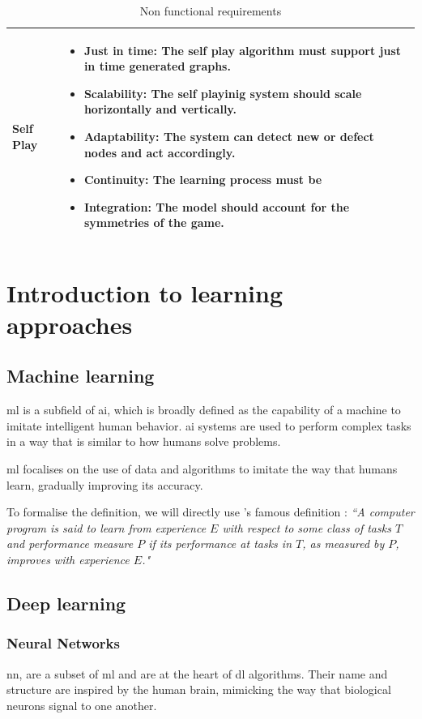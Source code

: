 \begin{table}[h]
\begin{tabularx}{\textwidth}{| p{3cm} | X |}
		\hline
		Self Play &\begin{itemize}
			\item \textbf{Just in time}: The self play algorithm must support just in time generated graphs.
			\item \textbf{Scalability}: The self playinig system should scale horizontally and vertically.
			\item \textbf{Adaptability}: The system can detect new or defect nodes and act accordingly.
			\item \textbf{Continuity}: The learning process must be 
			\item \textbf{Integration}: The model should account for the symmetries of the game.
		\end{itemize} \\
		
		\hline
	\end{tabularx}
	\caption{Non functional requirements
		\label{table:NonFunctionalRequirements}}
\end{table}

\section{Introduction to learning approaches}
\subsection{Machine learning}
\acrfull{ml} is a subfield of \acrfull{ai}, which is broadly defined as the capability of a machine to imitate intelligent human behavior. \acrshort{ai} systems are used to perform complex tasks in a way that is similar to how humans solve problems.

\acrshort{ml} focalises on the use of data and algorithms to imitate the way that humans learn, gradually improving its accuracy.

To formalise the definition, we will directly use \citeauthor{MachineLearning}'s famous definition \cite[page.~2]{MachineLearning}: \textit{``A computer program is said to learn from experience $E$ with respect to some class of tasks $T$ and performance measure $P$ if its performance at tasks in $T$, as measured by $P$, improves with experience $E$."}

\subsection{Deep learning}
\subsubsection{Neural Networks}
\acrfull{nn}, are a subset of \acrfull{ml} and are at the heart of \acrfull{dl} algorithms. Their name and structure are inspired by the human brain, mimicking the way that biological neurons signal to one another.

